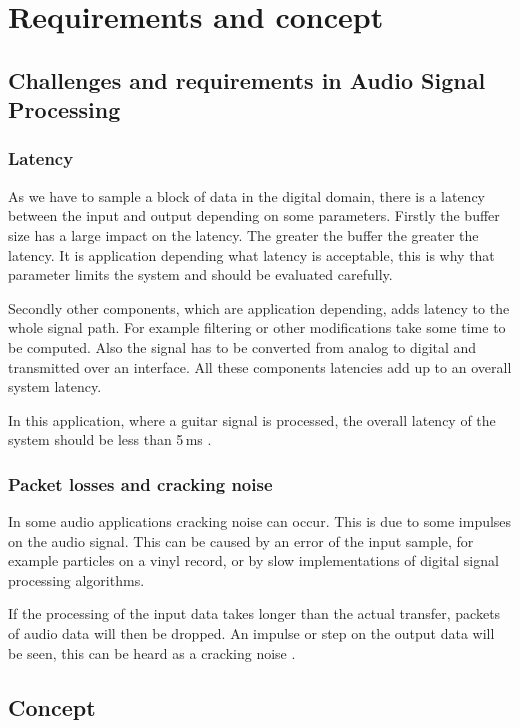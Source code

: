 \section{Requirements and concept}

\subsection{Challenges and requirements in Audio Signal Processing}

\subsubsection{Latency}

As we have to sample a block of data in the digital domain, there is a latency between the input and output
depending on some parameters. Firstly the buffer size has a large impact on the latency. The greater the buffer the
greater the latency. It is application depending what latency is acceptable, this is why that parameter
limits the system and should be evaluated carefully.

Secondly other components, which are application depending, adds latency to the whole signal path.
For example filtering or other modifications take some time to be computed. Also the signal has to
be converted from analog to digital and transmitted over an interface. All these components latencies add
up to an overall system latency. 

In this application, where a guitar signal is processed, the overall latency of the system should be less
than 5\,ms \cite{beckmann_dsp}.

\subsubsection{Packet losses and cracking noise}

In some audio applications cracking noise can occur. This is due to
some impulses on the audio signal. This can be caused by an error of the input sample, for example particles
on a vinyl record, or by slow implementations of digital signal processing algorithms.

If the processing of the input data takes longer than the actual transfer, packets of audio data will
then be dropped. An impulse or step on the output data will be seen, this can be heard as a cracking noise
\cite{stotz_audio_video}.

\subsection{Concept}

